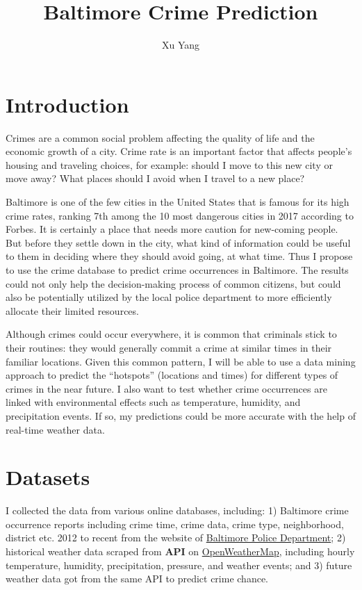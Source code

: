 \documentclass[]{article}
\title{Baltimore Crime Prediction}
\author{Xu Yang}
\date{}
\begin{document}
\maketitle

{
\setcounter{tocdepth}{2}
\tableofcontents
}
\section{Introduction}\label{introduction}

Crimes are a common social problem affecting the quality of life and the
economic growth of a city. Crime rate is an important factor that
affects people's housing and traveling choices, for example: should I
move to this new city or move away? What places should I avoid when I
travel to a new place?

Baltimore is one of the few cities in the United States that is famous
for its high crime rates, ranking 7th among the 10 most dangerous cities
in 2017 according to Forbes. It is certainly a place that needs more
caution for new-coming people. But before they settle down in the city,
what kind of information could be useful to them in deciding where they
should avoid going, at what time. Thus I propose to use the crime
database to predict crime occurrences in Baltimore. The results could
not only help the decision-making process of common citizens, but could
also be potentially utilized by the local police department to more
efficiently allocate their limited resources.

Although crimes could occur everywhere, it is common that criminals
stick to their routines: they would generally commit a crime at similar
times in their familiar locations. Given this common pattern, I will be
able to use a data mining approach to predict the ``hotspots''
(locations and times) for different types of crimes in the near future.
I also want to test whether crime occurrences are linked with
environmental effects such as temperature, humidity, and precipitation
events. If so, my predictions could be more accurate with the help of
real-time weather data.

\section{Datasets}\label{datasets}

I collected the data from various online databases, including: 1)
Baltimore crime occurrence reports including crime time, crime data,
crime type, neighborhood, district etc. 2012 to recent from the website
of
\href{https://www.baltimorepolice.org/crime-stats/open-data}{Baltimore
Police Department}; 2) historical weather data scraped from \textbf{API}
on \href{https://openweathermap.org/}{OpenWeatherMap}, including hourly
temperature, humidity, precipitation, pressure, and weather events; and
3) future weather data got from the same API to predict crime chance.
\end{document}
